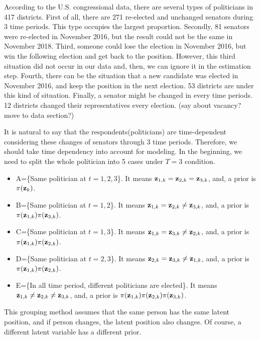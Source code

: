 \documentclass[a4paper, 11pt]{report}
\begin{document}
\begin{itemize}
\quad According to the U.S. congressional data, there are several types of politicians in 417 districts. First of all, there are 271 re-elected and unchanged senators during 3 time periods. This type occupies the largest proportion. Secondly, 81 senators were re-elected in November 2016, but the result could not be the same in November 2018. Third, someone could lose the election in November 2016, but win the following election and get back to the position. However, this third situation did not occur in our data and, then, we can ignore it in the estimation step. Fourth, there can be the situation that a new candidate was elected in November 2016, and keep the position in the next election. 53 districts are under this kind of situation. Finally, a senator might be changed in every time periods. 12 districts changed their representatives every election. (say about vacancy? move to data section?)

\quad It is natural to say that the respondents(politicians) are time-dependent considering these changes of senators through 3 time periods. Therefore, we should take  time dependency into account for modeling. In the beginning, we need to split the whole politician into 5 cases under $T=3$ condition.
\begin{itemize}
    \item A=\{Same politician at $t=1,2,3$\}. It means ${\bf z}_{1,k}={\bf z}_{2,k}={\bf z}_{3,k}$, and, a prior is $\pi({\bf z}_{k})$.
    \item B=\{Same politician at $t=1,2$\}. It means ${\bf z}_{1,k}={\bf z}_{2,k}\neq {\bf z}_{3,k}$, and, a prior is $\pi({\bf z}_{1,k})\pi({\bf z}_{3,k})$.
    \item C=\{Same politician at $t=1,3$\}. It means ${\bf z}_{1,k}={\bf z}_{3,k}\neq{\bf z}_{2,k}$, and, a prior is $\pi({\bf z}_{1,k})\pi({\bf z}_{2,k})$.
    \item D=\{Same politician at $t=2,3$\}. It means ${\bf z}_{2,k}={\bf z}_{3,k}\neq{\bf z}_{1,k}$, and, a prior is $\pi({\bf z}_{1,k})\pi({\bf z}_{2,k})$.
    \item E=\{In all time period, different politicians are elected\}. It means ${\bf z}_{1,k}\neq{\bf z}_{2,k}\neq{\bf z}_{3,k}$, and, a prior is $\pi({\bf z}_{1,k})\pi({\bf z}_{2,k})\pi({\bf z}_{3,k})$.
\end{itemize}

\quad This grouping method assumes that the same person has the same latent position, and if person changes, the latent position also changes. Of course, a different latent variable has a different prior.


\end{itemize}
\end{document}

